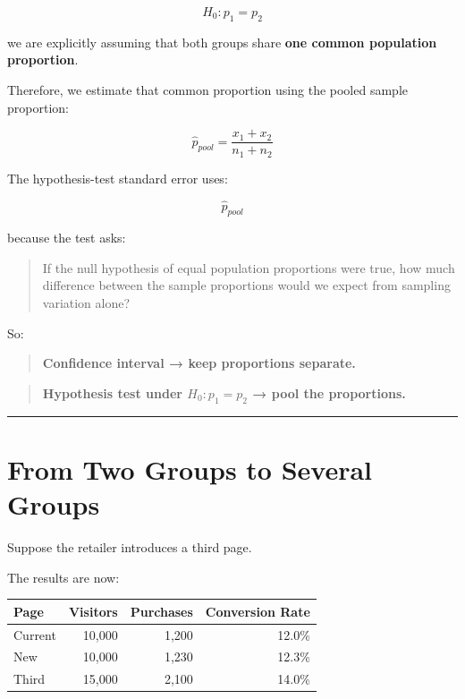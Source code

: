 \documentclass[
  letterpaper,
  DIV=11,
  numbers=noendperiod]{scrreprt}
\newcounter{none} %
\begin{document}
\[
H_0:p_1=p_2
\]

we are explicitly assuming that both groups share \textbf{one common
population proportion}.

Therefore, we estimate that common proportion using the pooled sample
proportion:

\[
\boxed{
\hat{p}_{pool}
=
\frac{x_1+x_2}{n_1+n_2}
}
\]

The hypothesis-test standard error uses:

\[
\hat{p}_{pool}
\]

because the test asks:

\begin{quote}
If the null hypothesis of equal population proportions were true, how
much difference between the sample proportions would we expect from
sampling variation alone?
\end{quote}

So:

\begin{quote}
\textbf{Confidence interval → keep proportions separate.}
\end{quote}

\begin{quote}
\textbf{Hypothesis test under \(H_0:p_1=p_2\) → pool the proportions.}
\end{quote}

\begin{center}\rule{0.5\linewidth}{0.5pt}\end{center}


\chapter{From Two Groups to Several
Groups}\label{from-two-groups-to-several-groups}

Suppose the retailer introduces a third page.

The results are now:

{\def\LTcaptype{none} %
\begin{longtable}[]{@{}lrrr@{}}
\toprule\noalign{}
Page & Visitors & Purchases & Conversion Rate \\
\midrule\noalign{}
\endhead
\bottomrule\noalign{}
\endlastfoot
Current & 10,000 & 1,200 & 12.0\% \\
New & 10,000 & 1,230 & 12.3\% \\
Third & 15,000 & 2,100 & 14.0\% \\
\end{longtable}
}
\end{document}
